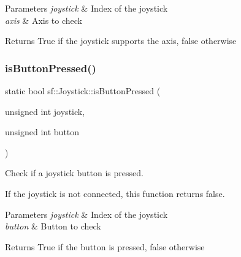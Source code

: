 \begin{DoxyParams}{Parameters}
{\em joystick} & Index of the joystick \\
\hline
{\em axis} & Axis to check\\
\hline
\end{DoxyParams}
\begin{DoxyReturn}{Returns}
True if the joystick supports the axis, false otherwise \begin{DoxyVerb}\end{DoxyVerb}
 
\end{DoxyReturn}
\mbox{\label{classsf_1_1_joystick_ae0d97a4b84268cbe6a7078e1b2717835}} 
\subsubsection{\texorpdfstring{isButtonPressed()}{isButtonPressed()}}
{\footnotesize\ttfamily static bool sf\+::\+Joystick\+::is\+Button\+Pressed (\begin{DoxyParamCaption}\item[{unsigned int}]{joystick,  }\item[{unsigned int}]{button }\end{DoxyParamCaption})\hspace{0.3cm}{\ttfamily [static]}}



Check if a joystick button is pressed. 

If the joystick is not connected, this function returns false.


\begin{DoxyParams}{Parameters}
{\em joystick} & Index of the joystick \\
\hline
{\em button} & Button to check\\
\hline
\end{DoxyParams}
\begin{DoxyReturn}{Returns}
True if the button is pressed, false otherwise \begin{DoxyVerb}\end{DoxyVerb}
 
\end{DoxyReturn}
\mbox{\label{classsf_1_1_joystick_ac7d4e1923e9f9420174f26703ea63d6c}} 
